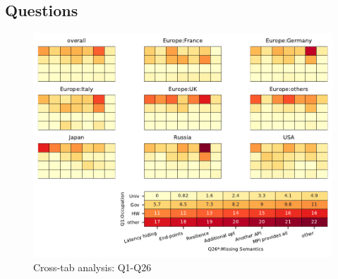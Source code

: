 
\subsection{Questions}


\begin{figure}
\begin{center}
\includegraphics[width=12cm]{../pdfs/Q1-Q26.pdf}
\caption{Cross-tab analysis: Q1-Q26}
\label{fig:Q1-Q26}
\end{center}
\end{figure}
